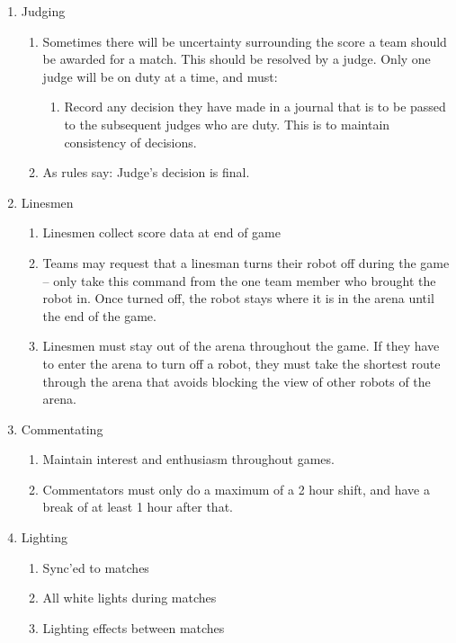 \begin{enumerate}
\begin{enumerate}
  \item Judging
    \begin{enumerate}
    \item Sometimes there will be uncertainty surrounding the score a team should be awarded for a match.  This should be resolved by a judge.  Only one judge will be on duty at a time, and must:
      \begin{enumerate}
      \item Record any decision they have made in a journal that is to be passed to the subsequent judges who are duty.  This is to maintain consistency of decisions.
      \end{enumerate}
    \item As rules say: Judge's decision is final.
    \end{enumerate}

  \item Linesmen
    \begin{enumerate}
    \item Linesmen collect score data at end of game
    \item Teams may request that a linesman turns their robot off during the game -- only take this command from the one team member who brought the robot in.  Once turned off, the robot stays where it is in the arena until the end of the game.
    \item Linesmen must stay out of the arena throughout the game.  If they have to enter the arena to turn off a robot, they must take the shortest route through the arena that avoids blocking the view of other robots of the arena.
    \end{enumerate}

  \item Commentating
    \begin{enumerate}
    \item Maintain interest and enthusiasm throughout games.
    \item Commentators must only do a maximum of a 2 hour shift, and have a break of at least 1 hour after that.
    \end{enumerate}


  \item Lighting
    \begin{enumerate}
    \item Sync'ed to matches
    \item All white lights during matches
    \item Lighting effects between matches
    \end{enumerate}


\end{enumerate}
\end{enumerate}
